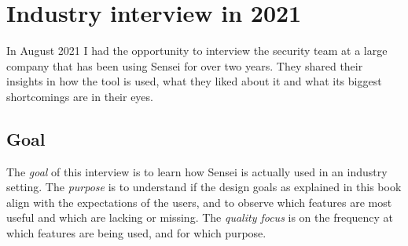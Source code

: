 \section{Industry interview in 2021}
\label{sec:trial}

%    
%    
%    
%    

In August 2021 I had the opportunity to interview the security team at a large company that has been using Sensei for over two years.
They shared their insights in how the tool is used, what they liked about it and what its biggest shortcomings are in their eyes. 
        
\subsection{Goal}
The \textit{goal} of this interview is to learn how Sensei is actually used in an industry setting.
The \textit{purpose} is to understand if the design goals as explained in this book align with the expectations of the users, and to observe which features are most useful and which are lacking or missing.
The \textit{quality focus} is on the frequency at which features are being used, and for which purpose.

